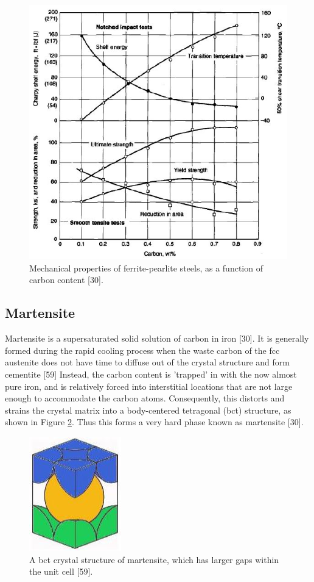 \documentclass[12pt]{report}
\begin{document}
\begin{figure}[H]
    \centering
    \includegraphics[width=.8\textwidth]{mechanical_properties_of_ferrite-pearlite_steels.jpg}
    \caption{Mechanical properties of ferrite-pearlite steels, as a function of carbon content [30]. }
    \label{ch3:figure:properties}
\end{figure}

\subsection{Martensite}
Martensite is a supersaturated solid solution of carbon in iron [30]. It is generally formed during the rapid cooling process when the waste carbon of the fcc austenite does not have time to diffuse out of the crystal structure and form cementite [59] Instead, the carbon content is 'trapped' in with the now almost pure iron, and is relatively forced into interstitial locations that are not large enough to accommodate the carbon atoms. Consequently, this distorts and strains the crystal matrix into a body-centered tetragonal (bct) structure, as shown in Figure \ref{ch3:figure:martensite}. Thus this forms a very hard phase known as martensite [30].
 
\begin{figure}[H]
    \centering
    \includegraphics[width=.25\textwidth]{bct_crystal_structure_of_martensite.jpg}
    \caption{A bct crystal structure of martensite, which has larger gaps within the unit cell [59].}
    \label{ch3:figure:martensite}
\end{figure}
\end{document}
